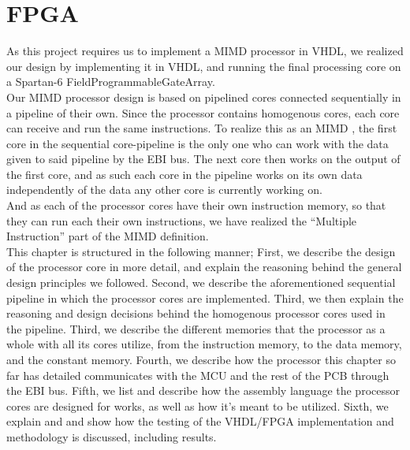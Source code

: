 \chapter{FPGA}\label{chapter:fpga}

As this project requires us to implement a MIMD processor in VHDL, we realized
our design by implementing it in VHDL, and running the final processing core on
a Spartan-6 FieldProgrammableGateArray.
\\
Our MIMD processor design is based on pipelined cores connected sequentially in
a pipeline of their own. Since the processor contains homogenous cores, each
core can receive and run the same instructions. To realize this as an MIMD , the first core in
the sequential core-pipeline is the only one who can work with the data given to
said pipeline by the EBI bus. The next core then works on the output of the
first core, and as such each core in the pipeline works on its own data
independently of the data any other core is currently working on.
\\
And as each of the processor cores have their own instruction memory, so that
they can run each their own instructions, we have realized the ``Multiple
Instruction''  part of the MIMD definition.
\\
This chapter is structured in the following manner; First, we describe the
design of the processor core in more detail, and explain the reasoning behind
the general design principles we followed. Second, we describe the
aforementioned sequential pipeline in which the processor cores are implemented.
Third, we then explain the reasoning and design decisions behind the homogenous
processor cores used in the pipeline. Third, we describe the different memories
that the processor as a whole with all its cores utilize, from the instruction
memory, to the data memory, and the constant memory. Fourth,
we describe how the processor this chapter so far has detailed communicates with
the MCU and the rest of the PCB through the EBI bus. Fifth, we list and
describe how the assembly language the processor cores are designed for works,
as well as how it's meant to be utilized. Sixth, we explain and and show how the
testing of the VHDL/FPGA  implementation
and methodology is discussed, including results.
%






